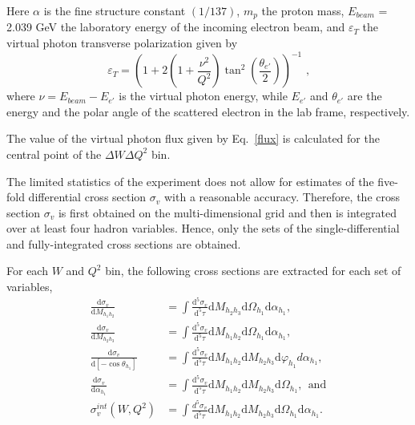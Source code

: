 Here $\alpha$ is the fine structure constant $\left(1/137\right)$, $m_{p}$ the proton mass, $E_{beam}$ = 2.039 GeV the laboratory energy of the incoming electron beam, and $\varepsilon_{T}$ the virtual photon transverse polarization given by \vspace{-1em}
\begin{equation}
\varepsilon_{T} = \left( 1 + 2\left( 1 +
\frac{\nu^{2}}{Q^{2}} \right)
\tan^{2}\left(\frac{\theta_{e'}}{2}\right) \right)^{-1} \textrm{ ,}
\label{polarization}
\end{equation}
where $\nu = E_{beam} - E_{e'}$ is the virtual photon energy, while $E_{e'}$ and $\theta_{e'}$ are the energy and the polar angle of the scattered electron in the lab frame, respectively. 

The value of the virtual photon flux given by Eq.~\eqref{flux} is calculated for the central point of the $\Delta W \Delta Q^{2}$ bin. %

The limited statistics of the experiment does not allow for estimates of the five-fold differential cross section $\sigma_{v}$ with a reasonable accuracy. Therefore, the cross section $\sigma_{v}$ is first obtained on the multi-dimensional grid and then is integrated over at least four hadron variables. Hence, only the sets of the single-differential and fully-integrated cross sections are obtained.


For each $W$ and $Q^{2}$ bin, the following cross sections are extracted for each set of variables,
\begin{equation}
\begin{aligned}
\frac{\textrm{d}\sigma_{v}}{\textrm{d}M_{h_{1}h_{2}}} & =\int\frac{\textrm{d}^{5}\sigma_{v}}{\textrm{d}^{5}\tau}\textrm{d}M_{h_{2}h_{3}}\textrm{d}\Omega_{h_{1}}\textrm{d}\alpha_{h_{1}}, \\
\frac{\textrm{d}\sigma_{v}}{\textrm{d}M_{h_{2}h_{3}}} & =\int\frac{\textrm{d}^{5}\sigma_{v}}{\textrm{d}^{5}\tau}\textrm{d}M_{h_{1}h_{2}}\textrm{d}\Omega_{h_{1}}\textrm{d}\alpha_{h_{1}}, \\
\frac{\textrm{d}\sigma_{v}}{\textrm{d}[-\cos\theta_{h_{1}}]} & =\int\frac{\textrm{d}^{5}\sigma_{v}}{\textrm{d}^{5}\tau}\textrm{d}M_{h_{1}h_{2}}\textrm{d}M_{h_{2}h_{3}}\textrm{d}\varphi_{h_{1}}d\alpha_{h_{1}}, \\
\frac{\textrm{d}\sigma_{v}}{\textrm{d}\alpha_{h_{1}}} & =\int\frac{\textrm{d}^{5}\sigma_{v}}{\textrm{d}^{5}\tau}\textrm{d}M_{h_{1}h_{2}}\textrm{d}M_{h_{2}h_{3}}\textrm{d}\Omega_{h_{1}},~~\text{and}\\
\sigma_{v}^{int} (W, Q^{2}) &= \int \frac{d^{5}\sigma_{v}}{\textrm{d}^{5}\tau}\textrm{d}M_{h_{1}h_{2}}\textrm{d}M_{h_{2}h_{3}}\textrm{d}\Omega_{h_{1}}\textrm{d}\alpha_{h_{1}}.
\end{aligned}
\label{inegr5diff}
\end{equation}

